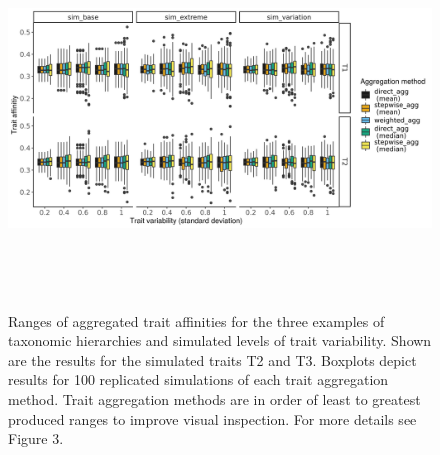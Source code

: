 \documentclass[12pt]{article}
\begin{document}
  \begin{figure}[H]
    \centering
    \includegraphics[width=16.5cm, height=10cm]{Overview_sim_results_T2_T3.png}
    \caption{Ranges of aggregated trait affinities for the three examples of taxonomic hierarchies and simulated levels of trait variability. Shown are the results for the simulated traits T2 and T3. Boxplots depict results for 100 replicated simulations of each trait aggregation method. Trait aggregation methods are in order of least to greatest produced ranges to improve visual inspection. For more details see Figure 3.}%
    \label{fig:overview_sim_results_T2_T3}
  \end{figure}
  
\end{document}
